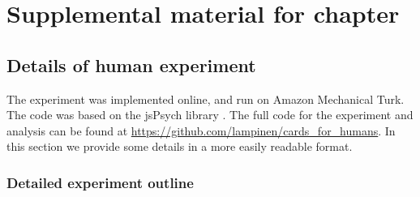 \chapter{Supplemental material for chapter } \label{appendix:human}

\section{Details of human experiment}
The experiment was implemented online, and run on Amazon Mechanical Turk. The code was based on the jsPsych library \citep{DeLeeuw2015}. The full code for the experiment and analysis can be found at \url{https://github.com/lampinen/cards_for_humans}. In this section we provide some details in a more easily readable format.

\subsection{Detailed experiment outline}

